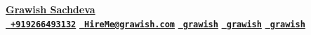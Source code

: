 \documentclass[10pt,a4paper,ragged2e,withhyper]{altacv}
\renewcommand{\namefont}{\Huge\rmfamily\bfseries\textbf}
\begin{document}
%
%
\begin{center}
	\href{https://grawish.com}{\textbf {\Huge \color{Black}\namefont Grawish Sachdeva}}	\\
	\vspace{10pt} 
	\large \texttt{\href{tel:+9266493132}{{\faPhone* \hspace{-10pt} \textbf{+919266493132}}}} \hspace{-5pt}
	\hspace{0pt}  \texttt{\href{mailto:HireMe@grawish.com}{{\faEnvelope \hspace{-3pt} \textbf{HireMe@grawish.com}}}} \hspace{2pt}
	\hspace{0pt}
	\texttt{\href{https://grawish.com/github}{{\faGithub \hspace{0pt} \textbf{grawish}}}}
	\hspace{0pt}  \texttt{\href{https://grawish.com/twitter}{{\faTwitter \hspace{-3pt} \textbf{grawish}}}}
	\vspace{0pt}
	\hspace{5pt}  \texttt{\href{https://grawish.com/linkedin}{{\faLinkedin \hspace{-1pt} \textbf{grawish}}}}
	\hspace{10pt}
	\vspace{-10pt}
	
\end{center}

\end{document}
